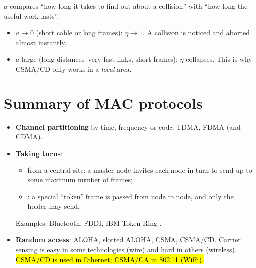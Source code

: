 \begin{intuition}[Everything depends on $a=\PROP/\TRANSP$]
$a$ compares ``how long it takes to find out about a collision'' with ``how long the useful work lasts''.
\begin{itemize}
  \item $a\to0$ (short cable or long frames): $\eta\to1$. A collision is noticed and aborted almost instantly.
  \item $a$ large (long distances, very fast links, short frames): $\eta$ collapses. This is why CSMA/CD only works in a \emph{local} area.
\end{itemize}
\end{intuition}

\begin{center}
\end{center}

\section{Summary of MAC protocols}

\begin{itemize}
  \item \textbf{Channel partitioning} by time, frequency or code: TDMA, FDMA (and CDMA).
  \item \textbf{Taking turns}:
    \begin{itemize}
      \item {} from a central site: a master node invites each node in turn to send up to some maximum number of frames;
      \item {}: a special ``token'' frame is passed from node to node, and only the holder may send.
    \end{itemize}
    Examples: Bluetooth, FDDI, IBM Token Ring .
  \item \textbf{Random access}: ALOHA, slotted ALOHA, CSMA, CSMA/CD. Carrier sensing is easy in some technologies (wire) and hard in others (wireless).
        \hl{CSMA/CD is used in Ethernet; CSMA/CA in 802.11 (WiFi).}
\end{itemize}

